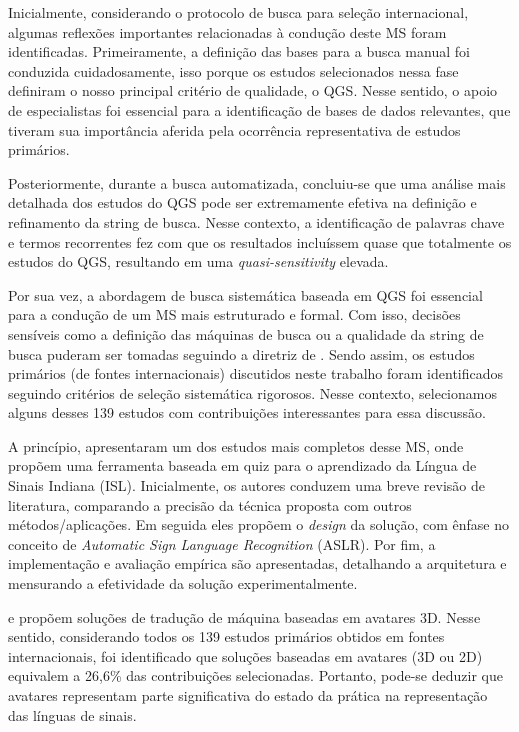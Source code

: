 Inicialmente, considerando o protocolo de busca para seleção internacional, algumas reflexões importantes relacionadas à condução deste MS foram identificadas. Primeiramente, a definição das bases para a busca manual foi conduzida cuidadosamente, isso porque os estudos selecionados nessa fase definiram o nosso principal critério de qualidade, o QGS. Nesse sentido, o apoio de especialistas foi essencial para a identificação de bases de dados relevantes, que tiveram sua importância aferida pela ocorrência representativa de estudos primários.


Posteriormente, durante a busca automatizada, concluiu-se que uma análise mais detalhada dos estudos do QGS pode ser extremamente efetiva na definição e refinamento da string de busca. Nesse contexto, a identificação de palavras chave e termos recorrentes fez com que os resultados incluíssem quase que totalmente os estudos do QGS, resultando em uma \textit{quasi-sensitivity} elevada.

Por sua vez, a abordagem de busca sistemática baseada em QGS foi essencial para a condução de um MS mais estruturado e formal. Com isso, decisões sensíveis como a definição das máquinas de busca ou a qualidade da string de busca puderam ser tomadas seguindo a diretriz de . Sendo assim, os estudos primários (de fontes internacionais) discutidos neste trabalho foram identificados seguindo critérios de seleção sistemática rigorosos. Nesse contexto, selecionamos alguns desses 139 estudos com contribuições interessantes para essa discussão.

A  princípio,  apresentaram um dos estudos mais completos desse MS, onde propõem uma ferramenta baseada em quiz para o aprendizado da Língua de Sinais Indiana (ISL). Inicialmente, os autores conduzem uma breve revisão de literatura, comparando a precisão da técnica proposta com outros métodos/aplicações. Em seguida eles propõem o \textit{design} da solução, com ênfase no conceito de \textit{Automatic Sign Language Recognition} (ASLR). Por fim, a implementação e avaliação empírica são apresentadas, detalhando a arquitetura e mensurando a efetividade da solução experimentalmente.

 e  propõem soluções de tradução de máquina baseadas em avatares 3D. Nesse sentido, considerando todos os 139 estudos primários obtidos em fontes internacionais, foi identificado que soluções baseadas em avatares (3D ou 2D) equivalem a 26,6\% das contribuições selecionadas. Portanto, pode-se deduzir que avatares representam parte significativa do estado da prática na representação das línguas de sinais.

